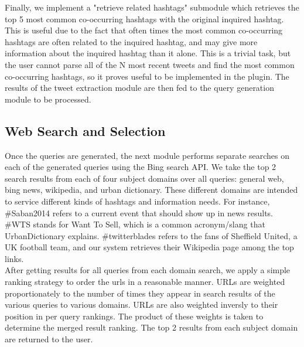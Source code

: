 \documentclass{sig-alternate}
\begin{document}
Finally, we implement a "retrieve related hashtags" submodule which retrieves the top 5 most common co-occurring hashtags with the original inquired hashtag. This is useful due to the fact that often times the most common co-occurring hashtags are often related to the inquired hashtag, and may give more information about the inquired hashtag than it alone. This is a trivial task, but the user cannot parse all of the N most recent tweets and find the most common co-occurring hashtags, so it proves useful to be implemented in the plugin. The results of the tweet extraction module are then fed to the query generation module to be processed.



\subsection{Web Search and Selection}
Once the queries are generated, the next module performs separate searches on each of the generated queries using the Bing search API.  We take the top 2 search results from each of four subject domains over all queries: general web, bing news, wikipedia, and urban dictionary.  These different domains are intended to service different kinds of hashtags and information needs.  For instance, \#Saban2014 refers to a current event that should show up in news results.  \#WTS stands for Want To Sell, which is a common acronym/slang that UrbanDictionary explains. \#twitterblades refers to the fans of Sheffield United, a UK football team, and our system retrieves their Wikipedia page among the top links. \\
After getting results for all queries from each domain search, we apply a simple ranking strategy to order the urls in a reasonable manner.  URLs are weighted proportionately to the number of times they appear in search results of the various queries to various domains.  URLs are also weighted inversly to their position in per query rankings.  The product of these weights is taken to determine the merged result ranking.  The top 2 results from each subject domain are returned to the user.\\
\end{document}
